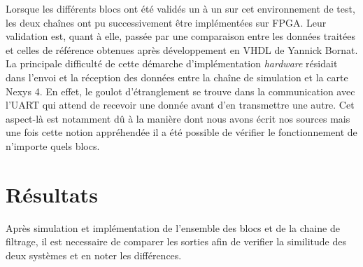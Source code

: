 \documentclass[a4paper,12pt]{article}
\begin{document}
	Lorsque les différents blocs ont été validés un à un sur cet environnement de test, les deux chaînes ont pu successivement être implémentées sur FPGA. Leur validation est, quant à elle, passée par une comparaison entre les données traitées et celles de référence obtenues après développement en VHDL de Yannick Bornat. La principale difficulté de cette démarche d'implémentation \textit{hardware} résidait dans l'envoi et la réception des données entre la chaîne de simulation et la carte Nexys 4. En effet, le goulot d'étranglement se trouve dans la communication avec l'UART qui attend de recevoir une donnée avant d'en transmettre une autre. Cet aspect-là est notamment dû à la manière dont nous avons écrit nos sources mais une fois cette notion appréhendée il a été possible de vérifier le fonctionnement de n'importe quels blocs.
\newpage
\section{Résultats}
	Après simulation et implémentation de l'ensemble des blocs et de la chaine de filtrage, il est necessaire de comparer les sorties afin de verifier la similitude des deux systèmes et en noter les différences.
\end{document}
